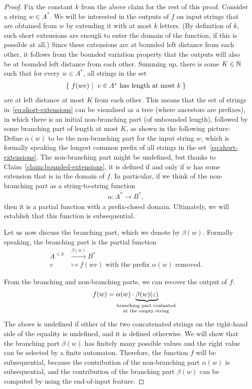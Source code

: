 \begin{proof}
   Fix the constant $k$ from the above claim for the rest of this proof.
   Consider a string $w \in A^*$. We will be interested in the outputs of $f$ on input strings that are obtained from $w$ by extending it with  at most $k$ letters. (By definition of $k$, such short extensions are enough to enter the domain of the function, if this is possible at all.) Since these extensions are at bounded left distance from each other, it follows from the bounded variation property that the outputs will also be at bounded left distance from each other. Summing up, there is some $K \in {\mathbb N}$ such that for every $w \in A^*$, all strings in the set  
   \begin{align}
    \label{eq:short-extensions}
   \setbuild{ f(wv)}{$v \in A^*$ has length at most $k$}
   \end{align}
   are at left distance at most $K$ from each other. This means that the set of strings in~\eqref{eq:short-extensions} can be visualised as a tree (where ancestors are prefixes), in which there is an initial non-branching part  (of unbounded length), followed by some branching part of length at most $K$, as shown in the following picture:
   Define $\alpha(w)$ to be the non-branching part for the input string $w$, which is formally speaking the longest common prefix of all strings in the set~\eqref{eq:short-extensions}. The non-branching part might be undefined, but thanks to Claim~\ref{claim:bounded-extensions}, it is defined if and only if $w$ has some extension that is in the domain of $f$. In particular, if we think of the non-branching part as a string-to-string function
   \begin{align*}
   \alpha : A^* \to B^*,
   \end{align*}
   then it is a partial function with a prefix-closed domain. Ultimately, we will establish that this function is subsequential. 
   
   Let us now discuss the branching part, which we denote by  $\beta(w)$. Formally speaking, the branching part is the partial function 
   \begin{align*}
    A^{\le k} & \xrightarrow{\beta(w)} B^* \\
    v & \mapsto f(wv) \text{ with the prefix $\alpha(w)$ removed.}
   \end{align*}

From the branching and non-branching parts, we can recover the output of $f$: 
\begin{align}\label{eq:f-from-alpha-beta}
f(w) = \alpha(w) \cdot \myunderbrace{\beta(w)(\varepsilon)}{branching part evaluated \\ at the empty string}
\end{align}
The above is undefined if either of the two concatenated strings on the right-hand side of the equality is undefined, and it is defined otherwise.
 We will show that  the branching part $\beta(w)$ has finitely many possible values and the right value can be selected by a finite automaton. Therefore, the function $f$ will be subsequential, because the contribution of the non-branching part $\alpha(w)$ is subsequential, and the contribution of the branching part $\beta(w)$ can be computed by using the end-of-input feature.


\end{proof}
